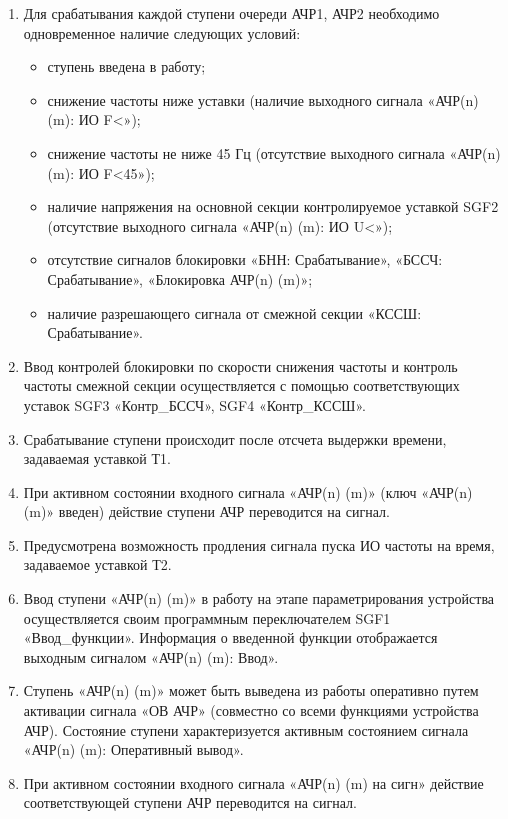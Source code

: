 \begin{enumerate}
\begin{enumerate}
\item
Для срабатывания каждой ступени очереди АЧР1, АЧР2 необходимо одновременное наличие следующих условий:
\begin{itemize}
    \item ступень введена в работу;
    \item снижение частоты ниже уставки (наличие выходного сигнала «АЧР(n) (m): ИО F<»);
    \item снижение частоты не ниже 45 Гц (отсутствие выходного сигнала «АЧР(n) (m): ИО F<45»);
    \item наличие напряжения на основной секции контролируемое уставкой SGF2 (отсутствие выходного сигнала «АЧР(n) (m): ИО U<»);
    \item отсутствие сигналов блокировки «БНН: Срабатывание», «БССЧ: Срабатывание», «Блокировка АЧР(n) (m)»;
    \item наличие разрешающего сигнала от смежной секции «КССШ: Срабатывание».
\end{itemize}

\item
Ввод контролей блокировки по скорости снижения частоты и контроль частоты смежной секции осуществляется с помощью соответствующих уставок SGF3 «Контр\_БССЧ», SGF4 «Контр\_КССШ».

\item
Срабатывание ступени происходит после отсчета выдержки времени, задаваемая уставкой Т1.

\item
При активном состоянии входного сигнала «АЧР(n) (m)» (ключ «АЧР(n) (m)» введен) действие ступени АЧР переводится на сигнал.

\item
Предусмотрена возможность продления сигнала пуска ИО частоты на время, задаваемое уставкой Т2.

\item
Ввод ступени «АЧР(n) (m)» в работу на этапе параметрирования устройства осуществляется своим программным переключателем SGF1 «Ввод\_функции». Информация о введенной функции отображается выходным сигналом «АЧР(n) (m): Ввод».
\item
Ступень «АЧР(n) (m)» может быть выведена из работы оперативно путем активации сигнала «ОВ АЧР» (совместно со всеми функциями устройства АЧР). Состояние ступени характеризуется активным состоянием сигнала «АЧР(n) (m): Оперативный вывод».

\item
При активном состоянии входного сигнала «АЧР(n) (m) на сигн» действие соответствующей ступени АЧР переводится на сигнал.


\end{enumerate}
\end{enumerate}
